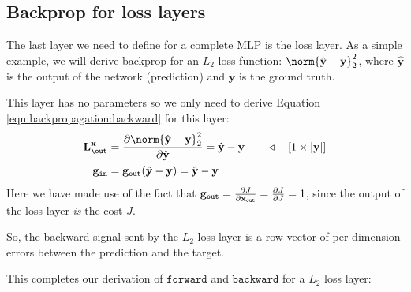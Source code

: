 \subsection{Backprop for loss layers}
The last layer we need to define for a complete MLP is the loss layer. As a simple example, we will derive backprop for an $L_2$ loss function: $\norm{\hat{\mathbf{y}} - \mathbf{y}}^2_2$, where $\hat{\mathbf{y}}$ is the output of the network (prediction) and $\mathbf{y}$ is the ground truth.

This layer has no parameters so we only need to derive Equation \ref{eqn:backpropagation:backward} for this layer:
\begin{align}
    \localgrad_{\out}^{\mathbf{x}} &= \frac{\partial \norm{\hat{\mathbf{y}} - \mathbf{y}}^2_2}{\partial \hat{\mathbf{y}}} = \hat{\mathbf{y}} - \mathbf{y} \quad\quad \triangleleft \quad [1 \times |\mathbf{y}|]\\
    \costgrad_{\texttt{in}} &= \costgrad_{\texttt{out}}(\hat{\mathbf{y}} - \mathbf{y}) = \hat{\mathbf{y}} - \mathbf{y}
\end{align}
Here we have made use of the fact that $\mathbf{g}_{\texttt{out}} = \frac{\partial J}{\partial \mathbf{x}_{\texttt{out}}} = \frac{\partial J}{\partial J} = 1$, since the output of the loss layer \textit{is} the cost $J$.

So, the backward signal sent by the $L_2$ loss layer is a row vector of per-dimension errors between the prediction and the target.

This completes our derivation of $\texttt{forward}$ and $\texttt{backward}$ for a $L_2$ loss layer:
\begin{figure}[h]
\centering
{}
\label{fig:backpropagation:L2_loss_layer_backprop}
\end{figure}

